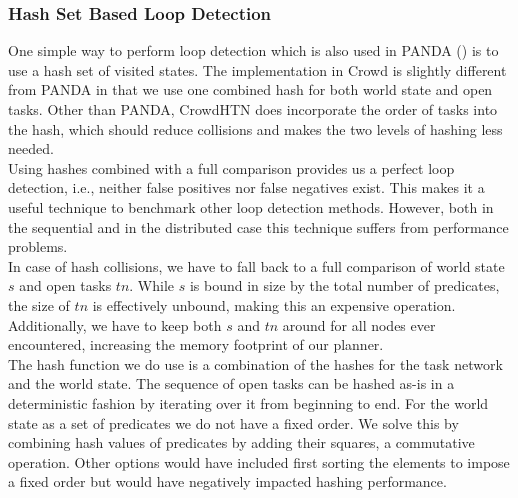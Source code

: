 \subsubsection{Hash Set Based Loop Detection}
\label{ld - perfect loop detection}
One simple way to perform loop detection which is also used in PANDA (\cite{holler2021loop}) is to use a hash set of visited states. The implementation in Crowd is slightly different from PANDA in that we use one combined hash for both world state and open tasks. Other than PANDA, CrowdHTN does incorporate the order of tasks into the hash, which should reduce collisions and makes the two levels of hashing less needed. \\
Using hashes combined with a full comparison provides us a perfect loop detection, i.e., neither false positives nor false negatives exist. This makes it a useful technique to benchmark other loop detection methods. However, both in the sequential and in the distributed case this technique suffers from performance problems. \\
In case of hash collisions, we have to fall back to a full comparison of world state $s$ and open tasks $tn$. While $s$ is bound in size by the total number of predicates, the size of $tn$ is effectively unbound, making this an expensive operation. Additionally, we have to keep both $s$ and $tn$ around for all nodes ever encountered, increasing the memory footprint of our planner. \\
The hash function we do use is a combination of the hashes for the task network and the world state. The sequence of open tasks can be hashed as-is in a deterministic fashion by iterating over it from beginning to end. For the world state as a set of predicates we do not have a fixed order. We solve this by combining hash values of predicates by adding their squares, a commutative operation. Other options would have included first sorting the elements to impose a fixed order but would have negatively impacted hashing performance.
\begin{comment}
	- Additionally, there is the full comparison for the world state
	- in practise this can be a problem, at the same time asymptotically it should not matter as it will be dwarfed by the 
	\todo{get some data on how many nodes share a world state on average as well as sizes of world states -> number of hash operations per world state!}
	- and the full comparison of open tasks
	- we cannot just free the open tasks and world state that are no longer needed! Both time and memory footprint are worse
	- worse memory and time complexity
	- however, it is a useful benchmark as to how many loops we *should* expect
\end{comment}

